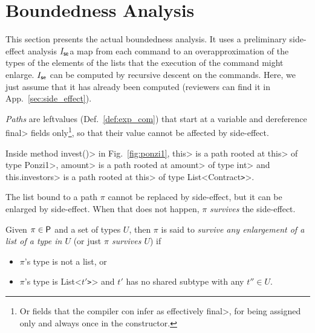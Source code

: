 \section{Boundedness Analysis}\label{sec:boundedness}

This section presents the actual boundedness analysis. It uses
a preliminary side-effect analysis $I_{\mathsf{se}}$\ie a map
from each command to an overapproximation of the types of the elements
of the lists that the execution of the command might enlarge.
$I_{\mathsf{se}}$ can be computed by recursive descent on the commands.
Here, we just assume that it has already been computed (reviewers can find it
in App.~\ref{sec:side_effect}).

\emph{Paths} are leftvalues
(Def.~\ref{def:exp_com}) that start at a variable and dereference \<final> fields
only\footnote{Or fields that the compiler con infer as effectively \<final>, for being
assigned only and always once in the constructor.},
so that their value cannot be affected by side-effect.
%
%
\begin{example}
  Inside method \<invest()> in Fig.~\ref{fig:ponzi1},
  \<this> is a path rooted at \<this> of type \<Ponzi1>,
  \<amount> is a path rooted at \<amount> of type \<int> and
  \<this.investors> is a path rooted at \<this> of type \<List<Contract\texttt{>}>.
\end{example}
%
The list bound to a path $\pi$ cannot be replaced by side-effect,
but it can be enlarged by side-effect. When that does not happen,
$\pi$ \emph{survives} the side-effect.
%
\begin{definition}\label{def:survival}
  Given $\pi\in\mathsf{P}$ and a set of types $U$, then $\pi$ is said to
  \emph{survive any enlargement of a list of a type in $U$} (or just
  \emph{$\pi$ survives $U$}) if
  \begin{itemize}
  \item $\pi$'s type is not a list, or
  \item $\pi$'s type is \<List<$t'$\texttt{>}> and $t'$ has no shared subtype with any $t''\in U$.
  \end{itemize}
\end{definition}

